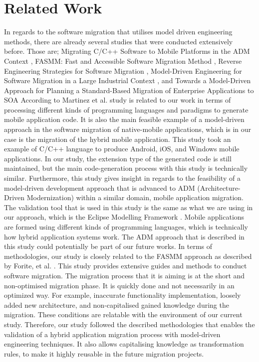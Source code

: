\documentclass[conference]{IEEEtran}
\begin{document}
\section{Related Work}
In regards to the software migration that utilises model driven engineering methods,
there are already several studies that were conducted extensively before.
Those are; Migrating C/C++ Software to Mobile Platforms in the ADM Context \cite{b6},
FASMM: Fast and Accessible Software Migration Method \cite{b7}, Reverse Engineering
Strategies for Software Migration \cite{b8}, Model-Driven Engineering
for Software Migration in a Large Industrial Context \cite{b9}, and
Towards a Model-Driven Approach for Planning a
Standard-Based Migration of Enterprise Applications to SOA \cite{b10}
\newline \newline
According to Martinez et al.\cite{b6} study is related to our work in terms of processing different kinds of
programming languages and paradigms to generate mobile application code. It is also
the main feasible example of a model-driven approach in the software migration of native-mobile applications,
which is in our case is the migration of the hybrid mobile application.
This study took an example of C/C++ language to produce Android, iOS, and Windows mobile applications.
In our study, the extension type of the generated code is still maintained, but the main code-generation process with this study
is technically similar.
\newline \newline
Furthermore, this study gives insight in regards to the feasibility of a model-driven development approach that is
advanced to ADM (Architecture-Driven Modernization) within a similar domain, mobile application migration.
The validation tool that is used in this study is the same as what we are using in our approach, which is the Eclipse Modelling Framework \cite{b2}.
Mobile applications are formed using different kinds of programming languages, which is technically
how hybrid application systems work.
The ADM approach that is described in this study could potentially be part of our future works.
\newline \newline
In terms of methodologies, our study is closely related to the FASMM approach as described by Forite, et al. \cite{b3} .
This study provides extensive guides and methods to conduct software migration. The migration
process that it is aiming is at the short and non-optimised migration phase.
It is quickly done and not necessarily in an optimized way. For example,
inaccurate functionality implementation, loosely added new architecture, and non-capitalised gained knowledge
during the migration. These conditions are relatable with the environment of our current study.
Therefore, our study followed the described methodologies that enables the validation of a
hybrid application migration process with model-driven engineering techniques. It also allows
capitalising knowledge as transformation rules, to make it highly reusable in the future migration projects.
\newline \newline
\end{document}
